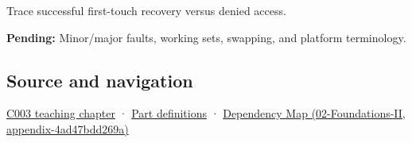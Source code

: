 Trace successful first-touch recovery versus denied access.

\textbf{Pending:} Minor/major faults, working sets, swapping, and platform terminology.

\subsection{Source and navigation}\label{source-and-navigation}

\href{Continuous\%20Notes/Computing\%20Foundations\%20-\%20From\%20Bits\%20to\%20C++\%20and\%20Systems\%20APIs\#Where\%20the\%20bytes\%20live}{C003 teaching chapter} · \hyperref[appendix-fd090d982a15]{Part definitions} · \href{}{Dependency Map (02-Foundations-II, appendix-4ad47bdd269a)}
